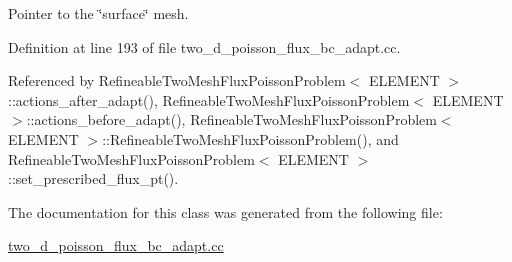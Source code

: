Pointer to the \char`\"{}surface\char`\"{} mesh. 



Definition at line 193 of file two\+\_\+d\+\_\+poisson\+\_\+flux\+\_\+bc\+\_\+adapt.\+cc.



Referenced by Refineable\+Two\+Mesh\+Flux\+Poisson\+Problem$<$ E\+L\+E\+M\+E\+N\+T $>$\+::actions\+\_\+after\+\_\+adapt(), Refineable\+Two\+Mesh\+Flux\+Poisson\+Problem$<$ E\+L\+E\+M\+E\+N\+T $>$\+::actions\+\_\+before\+\_\+adapt(), Refineable\+Two\+Mesh\+Flux\+Poisson\+Problem$<$ E\+L\+E\+M\+E\+N\+T $>$\+::\+Refineable\+Two\+Mesh\+Flux\+Poisson\+Problem(), and Refineable\+Two\+Mesh\+Flux\+Poisson\+Problem$<$ E\+L\+E\+M\+E\+N\+T $>$\+::set\+\_\+prescribed\+\_\+flux\+\_\+pt().



The documentation for this class was generated from the following file\+:\begin{DoxyCompactItemize}
\item 
\hyperlink{two__d__poisson__flux__bc__adapt_8cc}{two\+\_\+d\+\_\+poisson\+\_\+flux\+\_\+bc\+\_\+adapt.\+cc}\end{DoxyCompactItemize}

